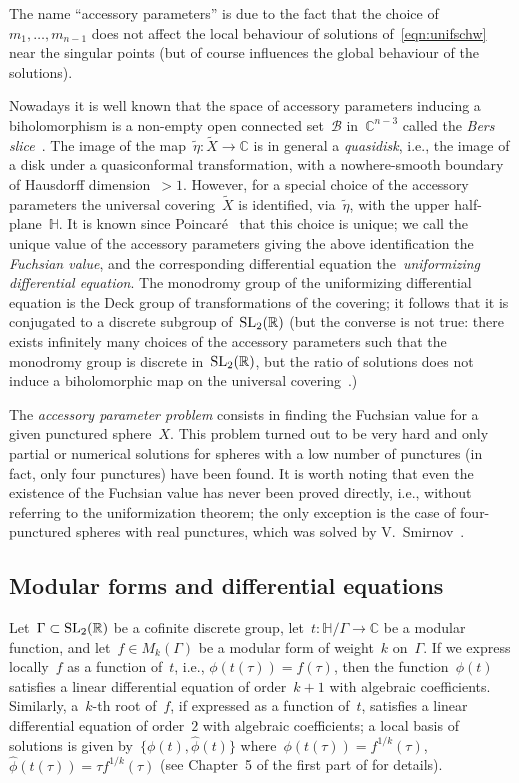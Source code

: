 \documentclass[pdftex]{sigma}
\newcommand{\C}{\mathbb{C}}
\newcommand{\R}{\mathbb{R}}
\newcommand{\Po}{\mathbb{H}}
\numberwithin{equation}{section}
\begin{document}
The name ``accessory parameters'' is due to the fact that the choice of $m_1,\dots,m_{n-1}$ does not affect the local behaviour of solutions of~\eqref{eqn:unifschw} near the singular points (but of course influences the global behaviour of the solutions).

Nowadays it is well known that the space of accessory parameters inducing a biholomorphism is a non-empty open connected set~$\mathcal{B}$ in~$\C^{n-3}$ called the \emph{Bers slice}~\cite{Bers}. The image of the map~$\widetilde{\eta}\colon\widetilde{X}\to\C$ is in general a \emph{quasidisk}, i.e., the image of a disk under a quasiconformal transformation, with a nowhere-smooth boundary of Hausdorff dimension~$>1$. However, for a special choice of the accessory parameters the universal covering~$\widetilde{X}$ is identified, via~$\widetilde{\eta}$, with the upper half-plane~$\Po$. It is known since Poincar\'e~\cite{Poincare} that this choice is unique; we call the unique value of the accessory parameters giving the above identification the \emph{Fuchsian value}, and the corresponding differential equation the~\emph{uniformizing differential equation}. The monodromy group of the uniformizing differential equation is the Deck group of transformations of the covering; it follows that it is conjugated to a discrete subgroup of~${\rm SL}_2(\R)$ (but the converse is not true: there exists infinitely many choices of the accessory parameters such that the monodromy group is discrete in~${\rm SL}_2(\R)$, but the ratio of solutions does not induce a biholomorphic map on the universal covering~\cite{Goldman}.)

The \emph{accessory parameter problem} consists in finding the Fuchsian value for a given punctured sphere~$X$. This problem turned out to be very hard and only partial or numerical solutions for spheres with a low number of punctures (in fact, only four punctures) have been found. It is worth noting that even the existence of the Fuchsian value has never been proved directly, i.e., without referring to the uniformization theorem; the only exception is the case of four-punctured spheres with real punctures, which was solved by V.~Smirnov~\cite{Smirnov}.

\subsection{Modular forms and differential equations}\label{sec:funcor}

Let~$\Gamma\subset{\rm SL}_2(\R)$ be a cofinite discrete group, let~$t\colon\Po/\Gamma\to\C$ be a modular function, and let~$f\in M_k(\Gamma)$ be a modular form of weight~$k$ on~$\Gamma$. If we express locally~$f$ as a function of~$t$, i.e., $\phi(t(\tau))=f(\tau)$, then the function~$\phi(t)$ satisfies a linear differential equation of order~$k+1$ with algebraic coefficients. Similarly, a~$k$-th root of~$f$, if expressed as a function of~$t$, satisfies a linear differential equation of order~$2$ with algebraic coefficients; a local basis of solutions is given by~$\big\{\phi(t),\hat{\phi}(t)\big\}$ where~$\phi(t(\tau))=f^{1/k}(\tau)$, $\hat{\phi}(t(\tau))=\tau f^{1/k}(\tau)$ (see Chapter~5 of the first part of \cite{123} for details).
\end{document}
